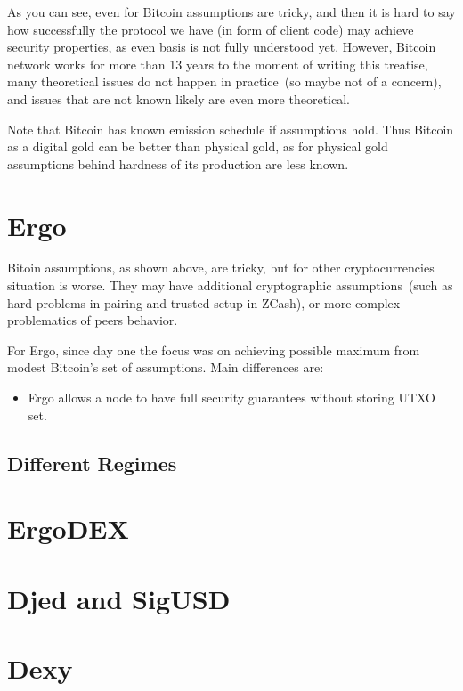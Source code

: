 \documentclass{article}   %
\newcommand{\authnote}[2]{\marginpar{\parbox{\marginparwidth}{\tiny %
  \textsf{#1 {\textcolor{blue}{notes: #2}}}}}%
  \textcolor{blue}{\textbf{\dag}}}
\newcommand{\authnote}[2]{
  \textsf{#1 \textcolor{blue}{: #2}}}
\newcommand{\authnote}[2]{}
\newcommand{\knote}[1]{{\authnote{\textcolor{green}{Alex notes}}{#1}}}
\begin{document}
As you can see, even for Bitcoin assumptions are tricky, and then it is hard to say how successfully the protocol we have (in form of client code) may achieve security properties, as even basis is not fully understood yet. However, Bitcoin network works for more than 13 years to the moment of writing this treatise, many theoretical issues do not happen in practice~(so maybe not of a concern), and issues that are not known likely are even more theoretical.

Note that Bitcoin has known emission schedule if assumptions hold. Thus Bitcoin as a digital gold can be better than physical gold, as for physical gold assumptions behind hardness of its production are less known.

\knote{fun facts, e.g. Bitcoin protocol is the code, but originally the code had unlimited emission.} 

\section{Ergo}

Bitoin assumptions, as shown above, are tricky, but for other cryptocurrencies situation is worse. They may have additional cryptographic assumptions~(such as hard problems in pairing and trusted setup in ZCash), or more complex problematics of peers behavior.

For Ergo, since day one the focus was on achieving possible maximum from modest Bitcoin's set of assumptions. Main differences are:

\begin{itemize}
  \item{} Ergo allows a node to have full security guarantees without storing UTXO set. 

\end{itemize} 


\subsection{Different Regimes}


\section{ErgoDEX}

\section{Djed and SigUSD}

\section{Dexy}


%







%
\end{document}
